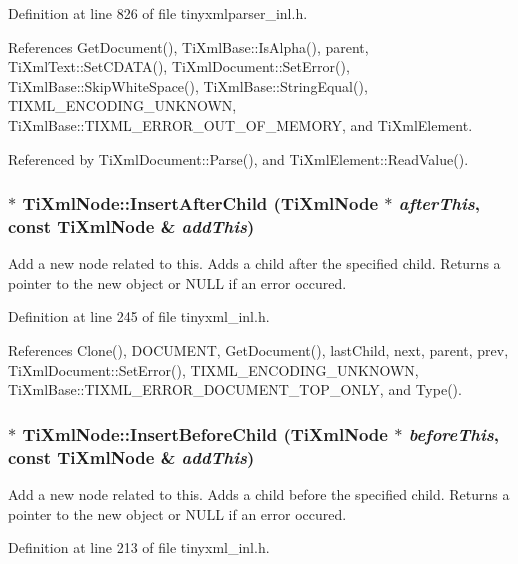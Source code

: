 Definition at line 826 of file tinyxmlparser\_\-inl.h.

References GetDocument(), TiXmlBase::IsAlpha(), parent, TiXmlText::SetCDATA(), TiXmlDocument::SetError(), TiXmlBase::SkipWhiteSpace(), TiXmlBase::StringEqual(), TIXML\_\-ENCODING\_\-UNKNOWN, TiXmlBase::TIXML\_\-ERROR\_\-OUT\_\-OF\_\-MEMORY, and TiXmlElement.

Referenced by TiXmlDocument::Parse(), and TiXmlElement::ReadValue().\hypertarget{class_ti_xml_node_a274db3292218202805c093f66a964cb5}{
\subsubsection[{InsertAfterChild}]{ $\ast$ TiXmlNode::InsertAfterChild ({\bf TiXmlNode} $\ast$ {\em afterThis}, \/  const {\bf TiXmlNode} \& {\em addThis})}}
\label{class_ti_xml_node_a274db3292218202805c093f66a964cb5}
Add a new node related to this. Adds a child after the specified child. Returns a pointer to the new object or NULL if an error occured. 

Definition at line 245 of file tinyxml\_\-inl.h.

References Clone(), DOCUMENT, GetDocument(), lastChild, next, parent, prev, TiXmlDocument::SetError(), TIXML\_\-ENCODING\_\-UNKNOWN, TiXmlBase::TIXML\_\-ERROR\_\-DOCUMENT\_\-TOP\_\-ONLY, and Type().\hypertarget{class_ti_xml_node_a71e54e393336382bc9875f64aab5cb15}{
\subsubsection[{InsertBeforeChild}]{ $\ast$ TiXmlNode::InsertBeforeChild ({\bf TiXmlNode} $\ast$ {\em beforeThis}, \/  const {\bf TiXmlNode} \& {\em addThis})}}
\label{class_ti_xml_node_a71e54e393336382bc9875f64aab5cb15}
Add a new node related to this. Adds a child before the specified child. Returns a pointer to the new object or NULL if an error occured. 

Definition at line 213 of file tinyxml\_\-inl.h.


